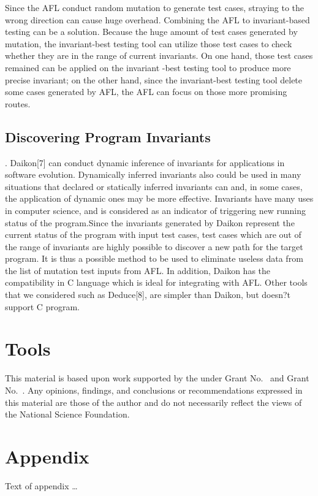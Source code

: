 \documentclass[sigplan,10pt,review]{acmart}\settopmatter{printfolios=true,printccs=false,printacmref=false}
\begin{document}
Since the AFL conduct random mutation to generate test cases, straying to the wrong direction can cause huge overhead. Combining the AFL to invariant-based testing can be a solution. Because the huge amount of test cases generated by mutation, the invariant-best testing tool can utilize those test cases to check whether they are in the range of current invariants. On one hand, those test cases remained can be applied on the invariant -best testing tool to produce more precise invariant; on the other hand, since the invariant-best testing tool delete some cases generated by AFL, the AFL can focus on those more promising routes.

\subsection{Discovering Program Invariants} . 
Daikon[7] can conduct dynamic inference of invariants for applications in software evolution. Dynamically inferred invariants also could be used in many situations that declared or statically inferred invariants can and, in some cases, the application of dynamic ones may be more effective. Invariants have many uses in computer science, and is considered as an indicator of triggering new running status of the program.Since the invariants generated by Daikon represent the current status of the program with input test cases, test cases which are out of the range of invariants are highly possible to discover a new path for the target program. It is thus a possible method to be used to eliminate useless data from the list of mutation test inputs from AFL. In addition, Daikon has the compatibility in C language which is ideal for integrating with AFL. Other tools that we considered such as Deduce[8], are simpler than Daikon, but doesn?t support C program.

\section{Tools}


\begin{acks}                            %
  This material is based upon work supported by the
   under Grant
  No.~ and Grant
  No.~.  Any opinions, findings, and
  conclusions or recommendations expressed in this material are those
  of the author and do not necessarily reflect the views of the
  National Science Foundation.
\end{acks}


%


\appendix
\section{Appendix}

Text of appendix \ldots
\end{document}
